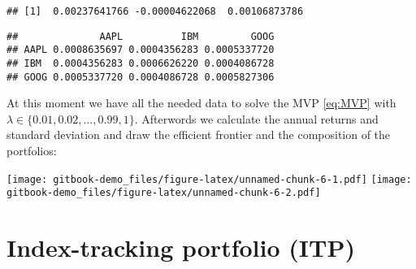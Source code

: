 \documentclass[
  oneside]{book}
\newenvironment{Shaded}{\begin{snugshade}}{\end{snugshade}}
\newcommand{\FunctionTok}[1]{\textcolor[rgb]{0.00,0.00,0.00}{#1}}
\newcommand{\NormalTok}[1]{#1}
\newcommand{\OtherTok}[1]{\textcolor[rgb]{0.56,0.35,0.01}{#1}}
\newcommand{\SpecialCharTok}[1]{\textcolor[rgb]{0.00,0.00,0.00}{#1}}
\begin{document}
\begin{verbatim}
## [1]  0.00237641766 -0.00004622068  0.00106873786
\end{verbatim}

\begin{Shaded}
\end{Shaded}

\begin{verbatim}
##              AAPL          IBM         GOOG
## AAPL 0.0008635697 0.0004356283 0.0005337720
## IBM  0.0004356283 0.0006626220 0.0004086728
## GOOG 0.0005337720 0.0004086728 0.0005827306
\end{verbatim}

At this moment we have all the needed data to solve the MVP \eqref{eq:MVP} with \(\lambda \in \{0.01, 0.02, ..., 0.99, 1\}\). Afterwords we calculate the annual returns and standard deviation and draw the efficient frontier and the composition of the portfolios:

\texttt{[image: gitbook-demo\_files/figure-latex/unnamed-chunk-6-1.pdf]} \texttt{[image: gitbook-demo\_files/figure-latex/unnamed-chunk-6-2.pdf]}

\hypertarget{index-tracking-portfolio-itp}{%
\section{Index-tracking portfolio (ITP)}\label{index-tracking-portfolio-itp}}
\end{document}
